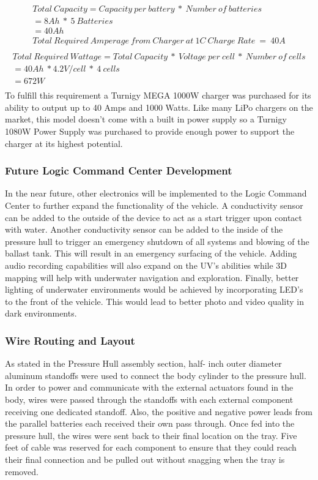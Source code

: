 \documentclass{report}
\begin{document}
\begin{equation}
\begin{split}
Total~Capacity = Capacity~per~battery~*~Number~of~batteries	\\
            = 8 Ah~*~5~Batteries\\
            = 40 Ah\\
            Total~Required~Amperage~from~Charger~at~1C~Charge~Rate~=~40A\\
\end{split}
\end{equation}
\begin{equation}
\begin{split}
Total~Required~Wattage =  Total~Capacity~*~Voltage~per~cell~*~Number~of~cells\\
			= 40Ah~*4.2 V/cell~*~4~cells\\
			= 672 W\\
\end{split}
\end{equation} 
To fulfill this requirement a Turnigy MEGA 1000W charger was purchased for its ability to output up to 40 Amps and 1000 Watts. Like many LiPo chargers on the market, this model doesn’t come with a built in power supply so a Turnigy 1080W Power Supply was purchased to provide enough power to support the charger at its highest potential. 
\subsubsection{Future Logic Command Center Development}
 In the near future, other electronics will be implemented to the Logic Command Center to further expand the functionality of the vehicle.  A conductivity sensor can be added to the outside of the device to act as a start trigger upon contact with water.  Another conductivity sensor can be added to the inside of the pressure hull to trigger an emergency shutdown of all systems and blowing of the ballast tank.  This will result in an emergency surfacing of the vehicle.  Adding audio recording capabilities will also expand on the UV’s abilities while 3D mapping will help with underwater navigation and exploration.  Finally, better lighting of underwater environments would be achieved by incorporating LED’s to the front of the vehicle.  This would lead to better photo and video quality in dark environments.
 \subsubsection{Wire Routing and Layout}
 As stated in the Pressure Hull assembly section, half- inch outer diameter aluminum standoffs were used to connect the body cylinder to the pressure hull.  In order to power and communicate with the external actuators found in the body, wires were passed through the standoffs with each external component receiving one dedicated standoff.  Also, the positive and negative power leads from the parallel batteries each received their own pass through.  Once fed into the pressure hull, the wires were sent back to their final location on the tray.  Five feet of cable was reserved for each component to ensure that they could reach their final connection and be pulled out without snagging when the tray is removed.
\end{document}
